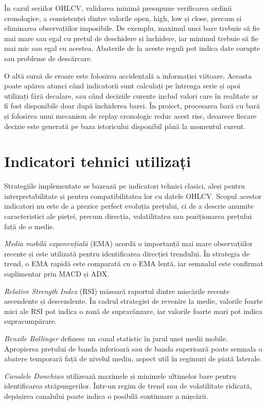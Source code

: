 În cazul seriilor OHLCV, validarea minimă presupune verificarea ordinii cronologice, a consistenței dintre valorile open, high, low și close, precum și eliminarea observațiilor imposibile. De exemplu, maximul unei bare trebuie să fie mai mare sau egal cu prețul de deschidere și închidere, iar minimul trebuie să fie mai mic sau egal cu acestea. Abaterile de la aceste reguli pot indica date corupte sau probleme de descărcare.

O altă sursă de eroare este folosirea accidentală a informației viitoare. Aceasta poate apărea atunci când indicatorii sunt calculați pe întreaga serie și apoi utilizați fără decalare, sau când deciziile curente includ valori care în realitate ar fi fost disponibile doar după închiderea barei. În proiect, procesarea bară cu bară și folosirea unui mecanism de replay cronologic reduc acest risc, deoarece fiecare decizie este generată pe baza istoricului disponibil până la momentul curent.

\section{Indicatori tehnici utilizați}
\label{cap:cap2:indicatori}

Strategiile implementate se bazează pe indicatori tehnici clasici, aleși pentru interpretabilitate și pentru compatibilitatea lor cu datele OHLCV. Scopul acestor indicatori nu este de a prezice perfect evoluția prețului, ci de a descrie anumite caracteristici ale pieței, precum direcția, volatilitatea sau poziționarea prețului față de o medie.

\textit{Media mobilă exponențială} (EMA) acordă o importanță mai mare observațiilor recente și este utilizată pentru identificarea direcției trendului. În strategia de trend, o EMA rapidă este comparată cu o EMA lentă, iar semnalul este confirmat suplimentar prin MACD și ADX.

\textit{Relative Strength Index} (RSI) măsoară raportul dintre mișcările recente ascendente și descendente. În cadrul strategiei de revenire la medie, valorile foarte mici ale RSI pot indica o zonă de supravânzare, iar valorile foarte mari pot indica supracumpărare.

\textit{Benzile Bollinger} definesc un canal statistic în jurul unei medii mobile. Apropierea prețului de banda inferioară sau de banda superioară poate semnala o abatere temporară față de nivelul mediu, aspect util în regimuri de piață laterale.

\textit{Canalele Donchian} utilizează maximele și minimele ultimelor bare pentru identificarea străpungerilor. Într-un regim de trend sau de volatilitate ridicată, depășirea canalului poate indica o posibilă continuare a mișcării.

